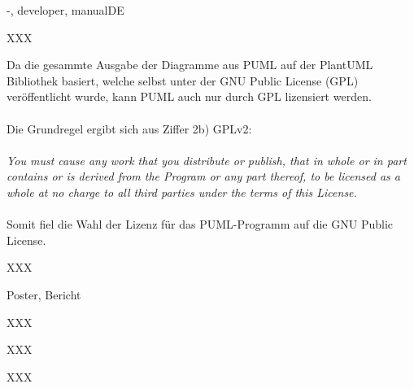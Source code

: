 \documentclass[twoside]{report}
\begin{document}
\begin{shownto}{-, developer, manualDE}
\nsecend

XXX
\nsecend

Da die gesammte Ausgabe der Diagramme aus PUML auf der PlantUML Bibliothek basiert, welche selbst unter der GNU Public License (GPL) veröffentlicht wurde, kann PUML auch nur durch GPL lizensiert werden.
\\\\
Die Grundregel ergibt sich aus Ziffer 2b) GPLv2:
\\\\
\textit{You must cause any work that you distribute or publish, that in whole or in part contains or is derived from the Program or any part thereof, to be licensed as a whole at no charge to all third parties under the terms of this License.
}\\\\
Somit fiel die Wahl der Lizenz für das PUML-Programm auf die GNU Public License.
\nsecend

\nsecend %



XXX
\nsecend

Poster, Bericht
\nsecend

XXX
\nsecend

XXX
\nsecend

XXX
\nsecend


\nsecend %

\nsecdocumentend

\end{shownto} %
\end{document}
